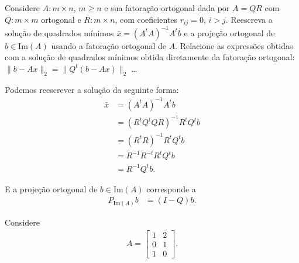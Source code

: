 \documentclass[a4paper,12pt, leqno, answers]{exam}
\begin{document}
\begin{questions}
    \question Considere $A : m \times n$, $m \geq n$ e sua fatora\c{c}\~{a}o ortogonal dada por $A = Q R$ com $Q : m \times m$ ortogonal e $R : m \times n$, com coeficientes $r_{ij} = 0$, $i > j$. Reescreva a solu\c{c}\~{a}o de quadrados m\'{i}nimos $\bar{x} = \left( A^t A \right)^{-1} A^t b$ e a proje\c{c}\~{a}o ortogonal de $b \in \text{Im}(A)$ usando a fatora\c{c}\~{a}o ortogonal de $A$. Relacione as express\~{o}es obtidas com a solu\c{c}\~{a}o de quadrados m\'{i}nimos obtida diretamente da fatora\c{c}\~{a}o ortogonal: $\| b - A x \|_2 = \| Q^t \left( b - A x \right) \|_2$ \ldots
    \begin{solution}
        Podemos reescrever a solu\c{c}\~{a}o da seguinte forma:
        \begin{align*}
            \bar{x} &= \left( A^t A \right)^{-1} A^t b \\
            &= \left( R^t Q^t Q R \right)^{-1} R^t Q^t b \\
            &= \left( R^t R \right)^{-1} R^t Q^t b \\
            &= R^{-1} R^{-t} R^t Q^t b \\
            &= R^{-1} Q^t b.
        \end{align*}

        E a proje\c{c}\~{a}o ortogonal de $b \in \text{Im}(A)$ corresponde a
        \begin{align*}
            P_{\text{Im}(A)} b &= (I - Q) b.
        \end{align*}
    \end{solution}

    \question Considere
    \begin{align*}
        A = \begin{bmatrix}
            1 & 2 \\
            0 & 1 \\
            1 & 0
        \end{bmatrix}.
    \end{align*}
    \begin{parts}

\end{parts}
\end{questions}
\end{document}
